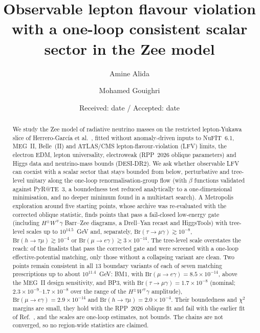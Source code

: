 \documentclass[twocolumn,epjc3]{svjour3}
\newcommand{\Br}{\mathrm{Br}}
\begin{document}
\sloppy\allowdisplaybreaks
\title{Observable lepton flavour violation with a one-loop consistent scalar sector in the Zee model}
\author{Amine Alida \and Mohamed Gouighri}
\date{Received: date / Accepted: date}
\maketitle
\begin{abstract}
We study the Zee model of radiative neutrino masses on the restricted lepton-Yukawa slice of Herrero-Garc\'ia et al.~\cite{HerreroGarcia:2017xdq}, fitted without anomaly-driven inputs to NuFIT~6.1, MEG~II, Belle~(II) and ATLAS/CMS lepton-flavour-violation (LFV) limits, the electron EDM, lepton universality, electroweak (RPP~2026 oblique parameters) and Higgs data and neutrino-mass bounds (DESI-DR2). We ask whether observable LFV can coexist with a scalar sector that stays bounded from below, perturbative and tree-level unitary along the one-loop renormalisation-group flow (with $\beta$ functions validated against PyR@TE~3, a boundedness test reduced analytically to a one-dimensional minimisation, and no deeper minimum found in a multistart search). A Metropolis exploration around five starting points, whose archive was re-evaluated with the corrected oblique statistic, finds points that pass a fail-closed low-energy gate (including $H^\pm W^\mp\gamma$ Barr--Zee diagrams, a Drell--Yan recast and HiggsTools) with tree-level scales up to $10^{14.5}$~GeV and, separately, $\Br(\tau\to\mu\gamma)\gtrsim10^{-8}$, $\Br(h\to\tau\mu)\gtrsim10^{-4}$ or $\Br(\mu\to e\gamma)\gtrsim3\times10^{-14}$. The tree-level scale overstates the reach: of the finalists that pass the corrected gate and were screened with a one-loop effective-potential matching, only those without a collapsing variant are clean. Two points remain consistent in all $13$ boundary variants of each of seven matching prescriptions up to about $10^{11.4}$~GeV: BM1, with $\Br(\mu\to e\gamma)=8.5\times10^{-14}$, above the MEG~II design sensitivity, and BP3, with $\Br(\tau\to\mu\gamma)=1.7\times10^{-8}$ (nominal; $2.3\times10^{-9}$--$1.7\times10^{-8}$ over the range of the $H^\pm W^\mp\gamma$ amplitude), $\Br(\mu\to e\gamma)=2.9\times10^{-14}$ and $\Br(h\to\tau\mu)=2.0\times10^{-4}$. Their boundedness and $\chi^2$ margins are small, they hold with the RPP~2026 oblique fit and fail with the earlier fit of Ref.~\cite{HerreroGarcia:2017xdq}, and the scales are one-loop estimates, not bounds. The chains are not converged, so no region-wide statistics are claimed.
\end{abstract}
\end{document}
